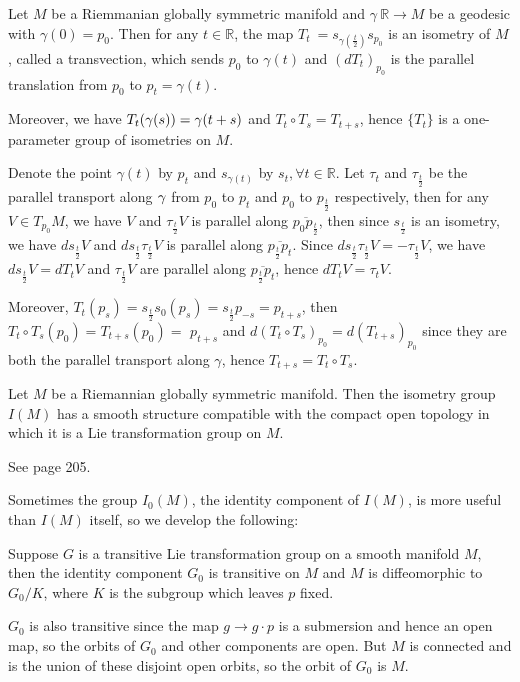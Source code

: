 \begin{lemma}\label{3.7}
Let $M$ be a Riemmanian globally symmetric manifold and $\gamma\:
\mathbb{R} \rightarrow M$ be a geodesic with $\gamma(0) = p_{0}
.$ Then for any $t \in \mathbb{R}$, the map $T_{t}\: =
s_{\gamma\left( \frac{t}{2} \right)} s_{p_{0}}$ is an isometry of
$M$, called a transvection, which sends $p_{0}$ to $\gamma(t)$
and $\left( d T_{t} \right)_{p_{0}}$ is the parallel translation
from $p_{0}$ to $p_{t} = \gamma(t)$.

Moreover, we have $T_t(\gamma(s)) = \gamma(t+s)$ and $T_t\circ T_s =
T_{t+s}$, hence $\{ T_t \}$ is a one-parameter group of
isometries on $M$.	
\end{lemma}
\bproof
Denote the point $\gamma(t)$ by $p_{t}$ and $s_{\gamma(t)}$ by
$s_{t}, \forall t \in \mathbb{R} .$ Let $\tau_{t}$ and
$\tau_{\frac{t}{2}}$ be the parallel transport along $\gamma $ from
$p_{0}$ to $p_{t}$ and $p_{0}$ to $p_{\frac{t}{2}}$ respectively,
then for any $V \in T_{p_{0}} M$, we have $V$ and
$\tau_{\frac{t}{2}} V$ is parallel along $\overline{p_{0}
p_{\frac{t}{2}}}$, then since $s_{\frac{t}{2}}$ is an isometry,
we have $d s_{\frac{t}{2}} V$ and $d s_{\frac{t}{2}}
\tau_{\frac{t}{2}} V$ is parallel along
$\overline{p_{\frac{t}{2}} p_{t}} .$ Since $d s_{\frac{t}{2}}
\tau_{\frac{t}{2}} V=-\tau_{\frac{t}{2}} V$, we have
$d s_{\frac{t}{2}} V=d T_{t} V$ and $\tau_{\frac{t}{2}} V$ are
parallel along $\overline{p_{\frac{t}{2}} p_{t}}$, hence $d T_{t}
V=\tau_{t} V .$

Moreover, $T_{t}\left( p_{s} \right)=s_{\frac{t}{2}} s_{0}\left(
p_{s} \right)=s_{\frac{t}{2}} p_{-s}=p_{t+s}$, then $T_{t} \circ
T_{s}\left( p_{0} \right)=T_{t+s}\left( p_{0} \right)=$
$p_{t+s}$ and $d\left( T_{t} \circ T_{s} \right)_{p_{0}}=d\left(
T_{t+s} \right)_{p_{0}}$ since they are both the parallel
transport along $\gamma$, hence $T_{t+s}=T_{t} \circ T_{s}$.
\eproof
\begin{theorem}
	Let $M$ be a Riemannian globally symmetric manifold. Then the
	isometry group $I(M)$ has a smooth structure compatible with
	the compact open topology in which it is a Lie transformation
	group on $M$.
\end{theorem}
\bproof
See \cite{Hel} page 205.
\eproof



Sometimes the group $I_0(M)$, the identity component of $I(M)$,
is more useful than $I(M)$ itself, so we develop the following:

\begin{lemma}
	Suppose $G$ is a transitive Lie transformation group on a
	smooth manifold $M$, then the identity component $G_0$ is
	transitive on $M$ and $M$ is diffeomorphic to $G_0/K$, where
	$K$ is the subgroup which leaves $p$ fixed.
\end{lemma}
\bproof
$G_0$ is also transitive since the map $g \to g \cdot p$ is a
submersion and hence an open map, so the orbits of $G_0$ and
other components are open. But $M$ is connected and is the union
of these disjoint open orbits, so the orbit of $G_0$ is $M$. 
\eproof

